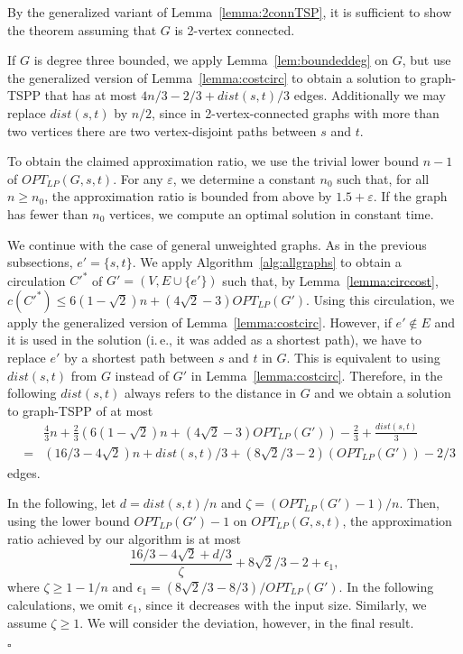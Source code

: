 \documentclass[letterpaper,11pt]{article}
\newenvironment{proof}{\begin{trivlist}
\item[\hskip\labelsep {\bf Proof}.]}{\QED \end{trivlist}}
\newcommand{\QED}{\hfill $\square$}
\newcommand{\OLP}[1]{\ensuremath{OPT_{LP}(#1)}}
\newcommand{\HPP}{graph-TSPP\xspace}
\newcommand{\dist}[1]{\ensuremath{dist(#1)}}
\begin{document}
\begin{proof}
By the generalized variant of Lemma~\ref{lemma:2connTSP}, it is sufficient to
show the theorem assuming that $G$ is 2-vertex connected.

If $G$ is degree three bounded, we apply Lemma~\ref{lem:boundeddeg} on $G$,
but use the generalized version of Lemma~\ref{lemma:costcirc} to obtain a
solution to \HPP that has at most $4n/3 - 2/3 + \dist{s,t}/3$ edges.
Additionally we may replace $\dist{s,t}$ by $n/2$, since in 2-vertex-connected graphs with more than two
vertices there are two vertex-disjoint paths between $s$ and $t$.

To obtain the claimed approximation ratio, we use the trivial lower bound $n-1$ of $\OLP{G,s,t}$.
For any $\varepsilon$, we determine a constant $n_0$ such that, for all $n \ge
n_0$, the approximation ratio is bounded from above by $1.5+\varepsilon$. If the graph has
fewer than $n_0$ vertices, we compute an optimal solution in constant time.

We continue with the case of general unweighted graphs.
As in the previous subsections, $e'=\{s,t\}$.
We apply Algorithm~\ref{alg:allgraphs} to obtain a
circulation $C'^*$ of $G'=(V,E \cup \{e'\})$ such that,
by Lemma~\ref{lemma:circcost},
$c(C'^*) \le 6(1-\sqrt{2})n + (4\sqrt{2} -3)\OLP{G'}$.
Using this circulation, we apply the generalized version of
Lemma~\ref{lemma:costcirc}. However, if $e' \notin E$ and it is used in the
solution (i.\,e., it was added as a shortest path), we have to replace $e'$ by a
shortest path between $s$ and $t$ in $G$.
This is equivalent to using $\dist{s,t}$ from $G$ instead of $G'$ in
Lemma~\ref{lemma:costcirc}. Therefore, in the following $\dist{s,t}$ always
refers to the distance in $G$ and
we obtain a solution to \HPP of at most
\begin{eqnarray*}
    &&\frac{4}{3}n + \frac{2}{3}(6(1-\sqrt{2})n + (4\sqrt{2} -3)\OLP{G'}) -
        \frac{2}{3} + \frac{\dist{s,t}}{3} \nonumber\\
    &=&(16/3 - 4\sqrt{2})n + \dist{s,t}/3 + (8 \sqrt{2}/3 - 2)(\OLP{G'}) - 2/3
\end{eqnarray*}
edges.

In the following, let $d=\dist{s,t}/n$ and $\zeta = (\OLP{G'}-1)/n$. Then, using
the lower bound $\OLP{G'}-1$ on $\OLP{G,s,t}$, the
approximation ratio achieved by our algorithm is at most
\begin{equation}\label{eqn:hppapprox}
\frac{16/3-4\sqrt{2}+d/3}{\zeta} + 8\sqrt{2}/3 - 2 + \epsilon_1,
\end{equation}
where $\zeta \ge 1 - 1/n$ and $\epsilon_1 = (8\sqrt{2}/3-8/3)/\OLP{G'}$.
In the following calculations, we omit $\epsilon_1$, since it decreases with the
input size. Similarly, we assume $\zeta \ge 1$. We will consider the deviation,
however, in the final result.


\end{proof}
\end{document}
